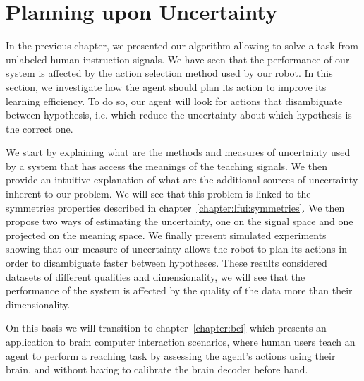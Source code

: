 
\chapter{Planning upon Uncertainty}
\label{chapter:planning}
\minitoc

In the previous chapter, we presented our algorithm allowing to solve a task from unlabeled human instruction signals. We have seen that the performance of our system is affected by the action selection method used by our robot. In this section, we investigate how the agent should plan its action to improve its learning efficiency. To do so, our agent will look for actions that disambiguate between hypothesis, i.e. which reduce the uncertainty about which hypothesis is the correct one.

We start by explaining what are the methods and measures of uncertainty used by a system that has access the meanings of the teaching signals. We then provide an intuitive explanation of what are the additional sources of uncertainty inherent to our problem. We will see that this problem is linked to the symmetries properties described in chapter~\ref{chapter:lfui:symmetries}. We then propose two ways of estimating the uncertainty, one on the signal space and one projected on the meaning space. We finally present simulated experiments showing that our measure of uncertainty allows the robot to plan its actions in order to disambiguate faster between hypotheses. These results considered datasets of different qualities and dimensionality, we will see that the performance of the system is affected by the quality of the data more than their dimensionality. 


On this basis we will transition to chapter~\ref{chapter:bci} which presents an application to brain computer interaction scenarios, where human users teach an agent to perform a reaching task by assessing the agent's actions using their brain, and without having to calibrate the brain decoder before hand.

